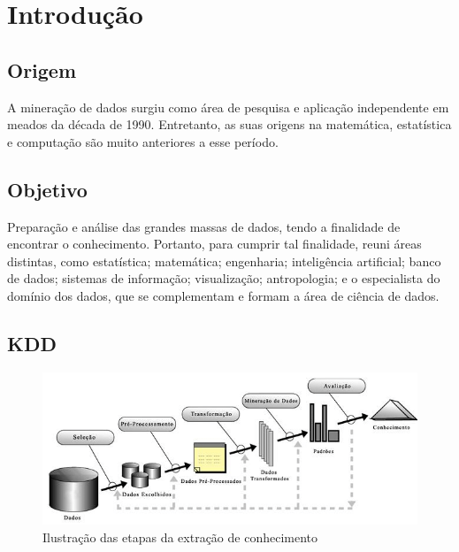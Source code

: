 \section{Introdução}


\subsection*{Origem}
A mineração de dados surgiu como área de pesquisa e aplicação independente em meados da década de 1990.
Entretanto, as suas origens na matemática, estatística e computação são muito anteriores a esse período.

\subsection*{Objetivo}
Preparação e análise das grandes massas de dados, tendo a finalidade de encontrar o conhecimento.
Portanto, para cumprir tal finalidade, reuni áreas distintas, como estatística; matemática; engenharia; inteligência artificial; banco de dados; sistemas de informação; visualização; antropologia; e o especialista do domínio dos dados, que se complementam e formam a área de ciência de dados.

\subsection*{KDD}

\begin{figure}[!htp]
	\centering
	\includegraphics[scale=.65]{../img/kdd/pt.png}
	\caption{Ilustração das etapas da extração de conhecimento}
	\label{img:kdd}
\end{figure}


